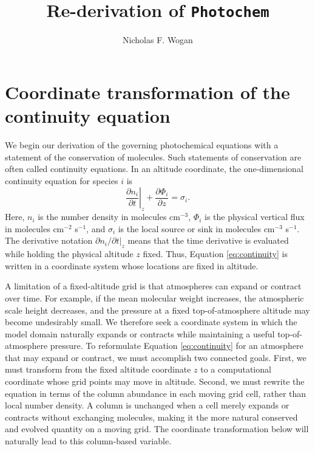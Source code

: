 \documentclass[twocolumn]{aastex631}
\begin{document}
\title{Re-derivation of \texttt{Photochem}}
\author{Nicholas F. Wogan}


\section{Coordinate transformation of the continuity equation}

We begin our derivation of the governing photochemical equations with a
statement of the conservation of molecules. Such statements of conservation
are often called continuity equations. In an altitude coordinate, the
one-dimensional continuity equation for species $i$ is
\begin{equation} \label{eq:continuity}
  \left.\frac{\partial n_i}{\partial t}\right|_z
  + \frac{\partial \Phi_i}{\partial z}
  = \sigma_i .
\end{equation}
Here, $n_i$ is the number density in molecules cm$^{-3}$, $\Phi_i$ is
the physical vertical flux in molecules cm$^{-2}$ s$^{-1}$, and $\sigma_i$ is the local source or sink in molecules cm$^{-3}$ s$^{-1}$. The derivative notation $\left.\partial n_i/\partial t\right|_z$ means that the time derivative is evaluated while holding the physical altitude $z$ fixed. Thus, Equation \eqref{eq:continuity} is written in a coordinate system whose locations are fixed in altitude.

A limitation of a fixed-altitude grid is that atmospheres can expand or
contract over time. For example, if the mean molecular weight increases, the
atmospheric scale height decreases, and the pressure at a fixed
top-of-atmosphere altitude may become undesirably small. We therefore seek a
coordinate system in which the model domain naturally expands or contracts
while maintaining a useful top-of-atmosphere pressure. To reformulate
Equation \eqref{eq:continuity} for an atmosphere that may
expand or contract, we must accomplish two connected goals. First, we must transform from the fixed altitude coordinate $z$ to a computational coordinate whose grid points may move in altitude. Second, we must rewrite the equation in terms of the column abundance in each moving grid cell, rather than local number density. A column is unchanged when a cell merely expands or contracts without exchanging molecules, making it the more natural conserved and evolved quantity on a moving grid. The coordinate transformation below will naturally lead to this column-based variable.
\end{document}

